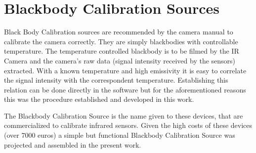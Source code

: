 \section{Blackbody Calibration Sources}
\par Black Body Calibration sources are recommended by the camera manual to calibrate the camera correctly. They are simply blackbodies with controllable temperature. The temperature controlled blackbody is to be filmed by the IR Camera and the camera's raw data (signal intensity received by the sensors) extracted. With a known temperature and high emissivity it is easy to correlate the signal intensity with the correspondent temperature. Establishing this relation can be done directly in the software but for the aforementioned reasons this was the procedure established and developed in this work.\\

\par The Blackbody Calibration Source is the name given to these devices, that are commercialized to calibrate infrared sensors. Given the high costs of these devices (over 7000 euros) a simple but functional Blackbody Calibration Source was projected and assembled in the present work.\\

